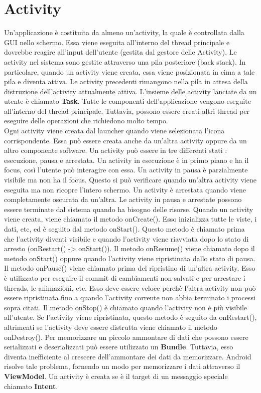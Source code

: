 \documentclass[12pt]{report}
\begin{document}
\section{Activity}
Un'applicazione è costituita da almeno un'activity, la quale è controllata dalla GUI nello schermo. Essa viene eseguita all'interno del thread principale e dovrebbe reagire all'input dell'utente (gestita dal gestore delle Activity). Le activity nel sistema sono gestite attraverso una pila posteriore (back stack). In particolare, quando un activity viene creata, essa viene posizionata in cima a tale pila e diventa attiva. Le activity precedenti rimangono nella pila in attesa della distruzione dell'activity attualmente attiva. L'insieme delle activity lanciate da un utente è chiamato \textbf{Task}. Tutte le componenti dell'applicazione vengono eseguite all'interno del thread principale. Tuttavia, possono essere creati altri thread per eseguire delle operazioni che richiedono molto tempo. \\Ogni activity viene creata dal launcher quando viene selezionata l'icona corrispondente. Essa può essere creata anche da un'altra activity oppure da un altro componente software. Un activity può essere in tre differenti stati : esecuzione, pausa e arrestata. Un activity in esecuzione è in primo piano e ha il focus, così l'utente può interagire con essa. Un activity in pausa è parzialmente visibile ma non ha il focus. Questo si può verificare quando un'altra activity viene eseguita ma non ricopre l'intero schermo. Un activity è arrestata quando viene completamente oscurata da un'altra. Le activity in pausa e arrestate possono essere terminate dal sistema quando ha bisogno delle risorse. Quando un activity viene creata, viene chiamato il metodo onCreate(). Esso inizializza tutte le viste, i dati, etc, ed è seguito dal metodo onStart(). Questo metodo è chiamato prima che l'activity diventi visibile e quando l'activity viene riavviata dopo lo stato di arresto (onRestart() -> onStart()). Il metodo onResume() viene chiamato dopo il metodo onStart() oppure quando l'activity viene ripristinata dallo stato di pausa. Il metodo onPause() viene chiamato prima del ripristino di un'altra activity. Esso è utilizzato per eseguire il commit di cambiamenti non salvati e per arrestare i threads, le animazioni, etc. Esso deve essere veloce perchè l'altra activity non può essere ripristinata fino a quando l'activity corrente non abbia terminato i processi sopra citati. Il metodo onStop() è chiamato quando l'activity non è più visibile all'utente. Se l'activity viene ripristinata, questo metodo è seguito da onRestart(), altrimenti se l'activity deve essere distrutta viene chiamato il metodo onDestroy(). Per memorizzare un piccolo ammontare di dati che possono essere serializzati e deserializzati può essere utilizzato un \textbf{Bundle}. Tuttavia, esso diventa inefficiente al crescere dell'ammontare dei dati da memorizzare. Android risolve tale problema, fornendo un modo per memorizzare i dati attraverso il \textbf{ViewModel}. Un activity è creata se è il target di un messaggio speciale chiamato \textbf{Intent}.
\end{document}
